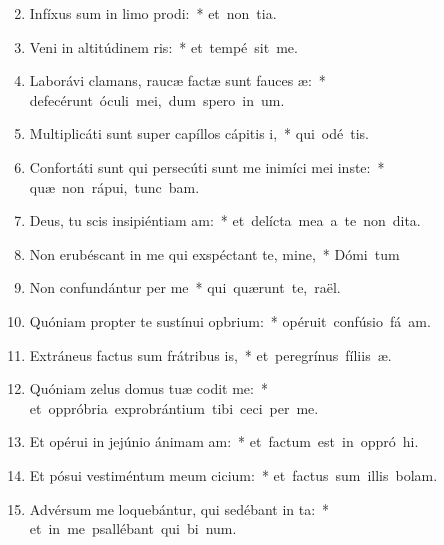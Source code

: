 \begin{flushleft}
\begin{enumerate}[leftmargin=*]
\setcounter{enumi}{1}


\item Infíxus sum in limo prodi:~* \mbox{et non  tia.}
\item Veni in altitúdinem ris:~* \mbox{et tempé sit me.}
\item Laborávi clamans, raucæ factæ sunt fauces æ:~* \mbox{defecérunt óculi mei, dum spero in  um.}
\item Multiplicáti sunt super capíllos cápitis i,~* \mbox{qui odé  tis.}
\item Confortáti sunt qui persecúti sunt me inimíci mei inste:~* \mbox{quæ non rápui, tunc bam.}
\item Deus, tu scis insipiéntiam am:~* \mbox{et delícta mea a te non  dita.}
\item Non erubéscant in me qui exspéctant te, mine,~* \mbox{Dómi tum}
\item Non confundántur per me~* \mbox{qui quærunt te,  raël.}
\item Quóniam propter te sustínui opbrium:~* \mbox{opéruit confúsio fá am.}
\item Extráneus factus sum frátribus is,~* \mbox{et peregrínus fíliis  æ.}
\item Quóniam zelus domus tuæ codit me:~* \mbox{et oppróbria exprobrántium tibi ceci per me.}
\item Et opérui in jejúnio ánimam am:~* \mbox{et factum est in oppró hi.}
\item Et pósui vestiméntum meum cicium:~* \mbox{et factus sum illis  bolam.}
\item Advérsum me loquebántur, qui sedébant in ta:~* \mbox{et in me psallébant qui bi num.}

\end{enumerate}
\end{flushleft}
